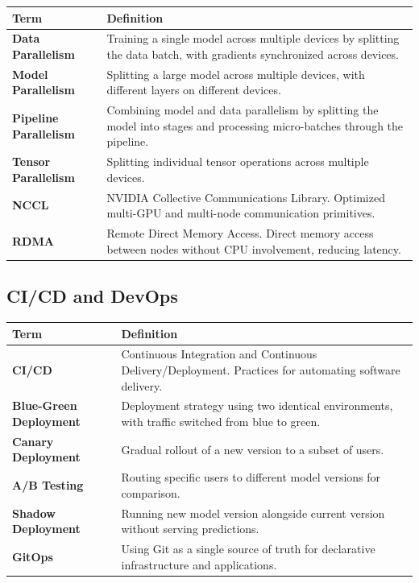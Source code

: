 \documentclass[11pt]{article}
\begin{document}
\begin{longtable}{|p{}|p{}|}
\hline
\textbf{Term} & \textbf{Definition} \\
\hline
\endhead
\textbf{Data Parallelism} & Training a single model across multiple devices by splitting the data batch, with gradients synchronized across devices. \\
\hline
\textbf{Model Parallelism} & Splitting a large model across multiple devices, with different layers on different devices. \\
\hline
\textbf{Pipeline Parallelism} & Combining model and data parallelism by splitting the model into stages and processing micro-batches through the pipeline. \\
\hline
\textbf{Tensor Parallelism} & Splitting individual tensor operations across multiple devices. \\
\hline
\textbf{NCCL} & NVIDIA Collective Communications Library. Optimized multi-GPU and multi-node communication primitives. \\
\hline
\textbf{RDMA} & Remote Direct Memory Access. Direct memory access between nodes without CPU involvement, reducing latency. \\
\hline
\end{longtable}

\subsection{CI/CD and DevOps}

\begin{longtable}{|p{}|p{}|}
\hline
\textbf{Term} & \textbf{Definition} \\
\hline
\endhead
\textbf{CI/CD} & Continuous Integration and Continuous Delivery/Deployment. Practices for automating software delivery. \\
\hline
\textbf{Blue-Green Deployment} & Deployment strategy using two identical environments, with traffic switched from blue to green. \\
\hline
\textbf{Canary Deployment} & Gradual rollout of a new version to a subset of users. \\
\hline
\textbf{A/B Testing} & Routing specific users to different model versions for comparison. \\
\hline
\textbf{Shadow Deployment} & Running new model version alongside current version without serving predictions. \\
\hline
\textbf{GitOps} & Using Git as a single source of truth for declarative infrastructure and applications. \\
\hline
\end{longtable}
\end{document}
